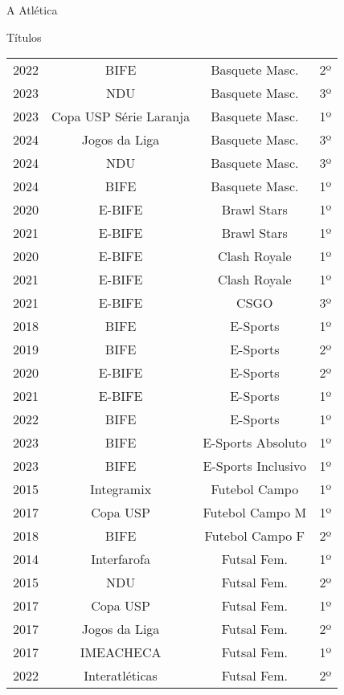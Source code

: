 \begin{secao}{A Atlética}
\begin{subsecao}{Títulos}
\begin{center}
\begin{tabular}{|c|c|c|c|}
    2022 & BIFE           & Basquete Masc.  & 2º\\
    2023 & NDU            & Basquete Masc.  & 3º\\
    2023 & Copa USP Série Laranja & Basquete Masc. & 1º\\
    2024 & Jogos da Liga  & Basquete Masc.  & 3º\\
    2024 & NDU            & Basquete Masc.  & 3º\\
    2024 & BIFE           & Basquete Masc.  & 1º\\
    2020 & E-BIFE         & Brawl Stars     & 1º\\
    2021 & E-BIFE         & Brawl Stars     & 1º\\
    2020 & E-BIFE         & Clash Royale    & 1º\\
    2021 & E-BIFE         & Clash Royale    & 1º\\
    2021 & E-BIFE         & CSGO            & 3º\\
    2018 & BIFE           & E-Sports        & 1º\\
    2019 & BIFE           & E-Sports        & 2º\\
    2020 & E-BIFE         & E-Sports        & 2º\\
    2021 & E-BIFE         & E-Sports        & 1º\\
    2022 & BIFE           & E-Sports        & 1º\\
    2023 & BIFE           & E-Sports Absoluto  & 1º\\
    2023 & BIFE           & E-Sports Inclusivo & 1º\\
    2015 & Integramix     & Futebol Campo   & 1º\\
    2017 & Copa USP       & Futebol Campo M & 1º\\
    2018 & BIFE           & Futebol Campo F & 2º\\
    2014 & Interfarofa    & Futsal Fem.     & 1º\\
    2015 & NDU            & Futsal Fem.     & 2º\\
    2017 & Copa USP       & Futsal Fem.     & 1º\\
    2017 & Jogos da Liga  & Futsal Fem.     & 2º\\
    2017 & IMEACHECA      & Futsal Fem.     & 1º\\
    2022 & Interatléticas & Futsal Fem.     & 2º\\
    \hline
         \end{tabular}
\end{center}
\begin{center}

\end{center}
\end{subsecao}
\end{secao}
